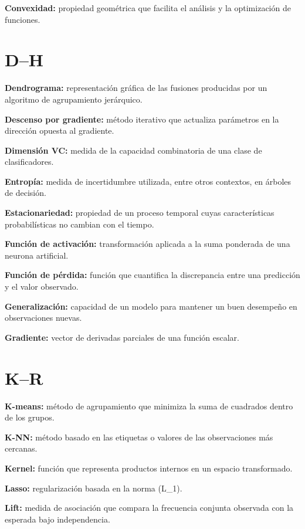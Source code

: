 \documentclass[
  spanish,
  10.5pt,
  letterpaper,
  DIV=11,
  numbers=noendperiod,
  oneside,
  open=any]{scrreprt}
\theoremstyle{definition}
\theoremstyle{definition}
\theoremstyle{plain}
\theoremstyle{remark}
\begin{document}
\textbf{Convexidad:} propiedad geométrica que facilita el análisis y la
optimización de funciones.

\section*{D--H}\label{dh}


\textbf{Dendrograma:} representación gráfica de las fusiones producidas
por un algoritmo de agrupamiento jerárquico.

\textbf{Descenso por gradiente:} método iterativo que actualiza
parámetros en la dirección opuesta al gradiente.

\textbf{Dimensión VC:} medida de la capacidad combinatoria de una clase
de clasificadores.

\textbf{Entropía:} medida de incertidumbre utilizada, entre otros
contextos, en árboles de decisión.

\textbf{Estacionariedad:} propiedad de un proceso temporal cuyas
características probabilísticas no cambian con el tiempo.

\textbf{Función de activación:} transformación aplicada a la suma
ponderada de una neurona artificial.

\textbf{Función de pérdida:} función que cuantifica la discrepancia
entre una predicción y el valor observado.

\textbf{Generalización:} capacidad de un modelo para mantener un buen
desempeño en observaciones nuevas.

\textbf{Gradiente:} vector de derivadas parciales de una función
escalar.

\section*{K--R}\label{kr}


\textbf{K-means:} método de agrupamiento que minimiza la suma de
cuadrados dentro de los grupos.

\textbf{K-NN:} método basado en las etiquetas o valores de las
observaciones más cercanas.

\textbf{Kernel:} función que representa productos internos en un espacio
transformado.

\textbf{Lasso:} regularización basada en la norma (L\_1).

\textbf{Lift:} medida de asociación que compara la frecuencia conjunta
observada con la esperada bajo independencia.
\end{document}
